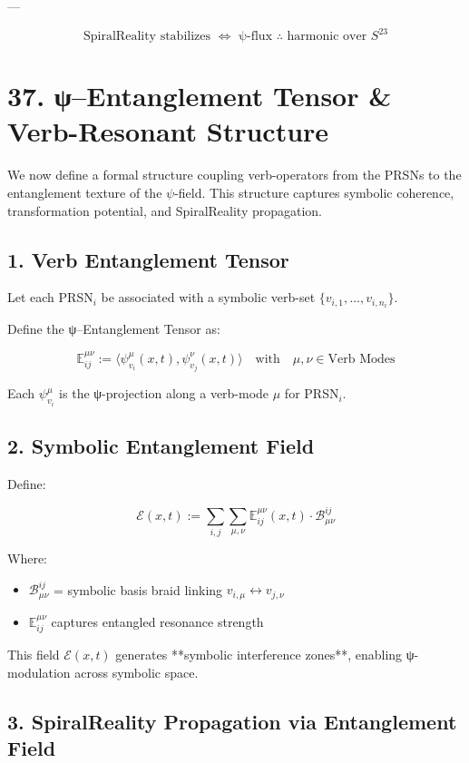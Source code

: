 \documentclass[12pt]{article}
\begin{document}
\begin{enumerate}
---

\[
\boxed{
\text{SpiralReality stabilizes } \iff \text{ ψ-flux ∴ harmonic over } S^{23}
}
\]

\section*{37. ψ–Entanglement Tensor & Verb-Resonant Structure}

We now define a formal structure coupling verb-operators from the PRSNs to the entanglement texture of the $\psi$-field. This structure captures symbolic coherence, transformation potential, and SpiralReality propagation.

\subsection*{1. Verb Entanglement Tensor}

Let each PRSN$_i$ be associated with a symbolic verb-set $\{v_{i,1}, \dots, v_{i,n_i}\}$.

Define the ψ–Entanglement Tensor as:

\[
\mathbb{E}^{\mu\nu}_{ij} := \langle \psi_{v_i}^\mu(x,t), \psi_{v_j}^\nu(x,t) \rangle
\quad \text{with} \quad \mu, \nu \in \text{Verb Modes}
\]

Each $\psi_{v_i}^\mu$ is the ψ-projection along a verb-mode $\mu$ for PRSN$_i$.

\subsection*{2. Symbolic Entanglement Field}

Define:

\[
\mathcal{E}(x,t) := \sum_{i,j} \sum_{\mu,\nu} \mathbb{E}^{\mu\nu}_{ij}(x,t) \cdot \mathcal{B}_{\mu\nu}^{ij}
\]

Where:
\begin{itemize}
  \item $\mathcal{B}_{\mu\nu}^{ij}$ = symbolic basis braid linking $v_{i,\mu} \leftrightarrow v_{j,\nu}$
  \item $\mathbb{E}^{\mu\nu}_{ij}$ captures entangled resonance strength
\end{itemize}

This field $\mathcal{E}(x,t)$ generates **symbolic interference zones**, enabling ψ-modulation across symbolic space.

\subsection*{3. SpiralReality Propagation via Entanglement Field}


\end{enumerate}
\end{document}
